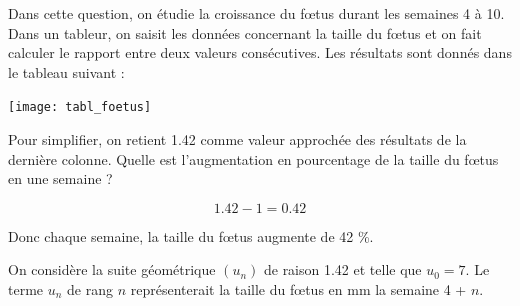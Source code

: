 \begin{questions}
	\question[2] 
	
	\question[2]
		Dans cette question, on étudie la croissance du f\oe tus durant les semaines 4 à 10. Dans un tableur, on saisit les données concernant la taille du f\oe tus et on fait calculer le rapport entre deux valeurs consécutives.
		Les résultats sont donnés dans le tableau suivant :
		
		\begin{center}
			\texttt{[image: tabl\_foetus]}
		\end{center}
		
		Pour simplifier, on retient \num{1.42} comme valeur approchée des résultats de la dernière colonne. Quelle est l'augmentation en pourcentage de la taille du f\oe tus en une semaine ?
		
		\begin{solution}
			\begin{equation*}
				\num{1.42} - 1 = \num{0.42}
			\end{equation*}
			
			Donc chaque semaine, la taille du f\oe tus augmente de 42 \%.
		\end{solution}
		
	\question[4]
		On considère la suite géométrique $(u_n)$ de raison \num{1.42} et telle que $u_0 = 7$. Le terme $u_n$ de rang $n$ représenterait la taille du f\oe tus en mm la semaine 4 + $n$.
		\begin{parts}

\end{parts}
\end{questions}

